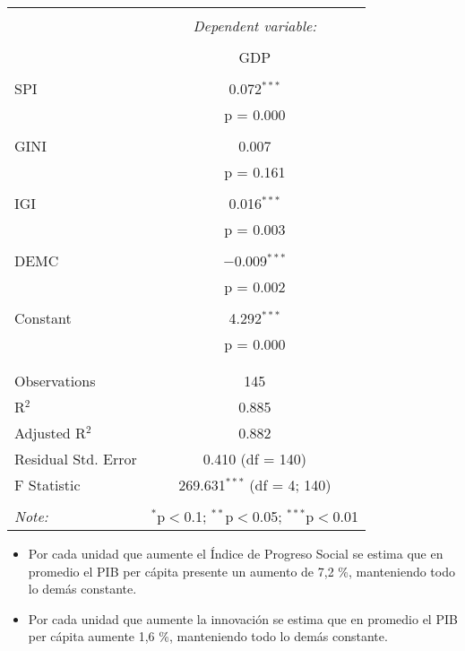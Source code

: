 \documentclass[11pt]{article}
\begin{document}
{\begin{table}[!htbp] \centering 
  \caption{} 
  \label{} 
\begin{tabular}{@{\extracolsep{5pt}}lc} 
\\[-1.8ex]\hline 
\hline \\[-1.8ex] 
 & \multicolumn{1}{c}{\textit{Dependent variable:}} \\ 
\cline{2-2} 
\\[-1.8ex] & GDP \\ 
\hline \\[-1.8ex] 
 SPI & 0.072$^{***}$ \\ 
  & p = 0.000 \\ 
  & \\ 
 GINI & 0.007 \\ 
  & p = 0.161 \\ 
  & \\ 
 IGI & 0.016$^{***}$ \\ 
  & p = 0.003 \\ 
  & \\ 
 DEMC & $-$0.009$^{***}$ \\ 
  & p = 0.002 \\ 
  & \\ 
 Constant & 4.292$^{***}$ \\ 
  & p = 0.000 \\ 
  & \\ 
\hline \\[-1.8ex] 
Observations & 145 \\ 
R$^{2}$ & 0.885 \\ 
Adjusted R$^{2}$ & 0.882 \\ 
Residual Std. Error & 0.410 (df = 140) \\ 
F Statistic & 269.631$^{***}$ (df = 4; 140) \\ 
\hline 
\hline \\[-1.8ex] 
\textit{Note:}  & \multicolumn{1}{r}{$^{*}$p$<$0.1; $^{**}$p$<$0.05; $^{***}$p$<$0.01} \\ 
\end{tabular} 
\end{table}

\begin{itemize}
    \item Por cada unidad que aumente el Índice de Progreso Social se estima que en promedio el PIB per cápita presente un aumento de 7,2 \%, manteniendo todo lo demás constante. 
    
    \item Por cada unidad que aumente la innovación se estima que en promedio el PIB per cápita aumente 1,6 \%, manteniendo todo lo demás constante.
    

\end{itemize}}
\end{document}
